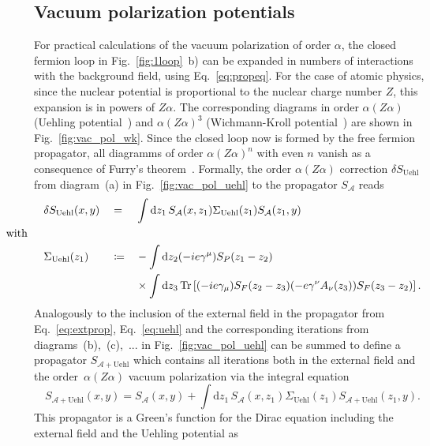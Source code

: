 \subsection{Vacuum polarization potentials}
\label{sec:vacPolTheory}
For practical calculations of the vacuum polarization of order $\alpha$, the closed fermion loop in Fig.~\ref{fig:1loop}~b) can be expanded in numbers of interactions with the background field, using Eq.~\ref{eq:propeq}. For the case of atomic physics, since the nuclear potential is proportional to the nuclear charge number $Z$, this expansion is in powers of $Z\alpha$. The corresponding diagrams in order $\alpha(Z\alpha)$ (Uehling potential~\cite{uehling1935}) and $\alpha(Z\alpha)^3$ (Wichmann-Kroll potential~\cite{wichmann1956}) are shown in Fig.~\ref{fig:vac_pol_wk}. Since the closed loop now is formed by the free fermion propagator, all diagramms of order $\alpha(Z\alpha)^n$ with even $n$ vanish as a consequence of Furry's theorem~\mbox{\cite[Section~10.1.]{peskin1995}}. Formally, the order $\alpha (Z\alpha)$ correction $\delta S_{\text{Uehl}}$ from diagram~(a) in Fig.~\ref{fig:vac_pol_uehl} to the propagator $S_{\mathcal{A}}$ reads
\begin{alignat}{3}
\label{eq:uehl}
&\delta S_{\text{Uehl}}(x,y) &&=&& \int \mathrm{d}z_1\,S_{\mathcal{A}}(x,z_1)\Sigma_{\text{Uehl}}(z_1)S_{\mathcal{A}}(z_1,y)\\
&\hspace{-1.2cm}\text{with}\notag\\
&\Sigma_{\text{Uehl}}(z_1) &&\coloneqq&& -\int\mathrm{d}z_2(-ie\gamma^\mu)S_P(z_1-z_2)\notag\\
&&&&&\times\int\mathrm{d}z_3\,\Tr\left[(-ie\gamma_\mu)S_F(z_2-z_3)(-e\gamma^\nu A_\nu (z_3))S_F(z_3-z_2)\right].\notag
\end{alignat}
Analogously to the inclusion of the external field in the propagator from Eq.~\eqref{eq:extprop}, Eq.~\eqref{eq:uehl} and the corresponding iterations from diagrams~(b),~(c),~... in Fig.~\ref{fig:vac_pol_uehl} can be summed to define a propagator $S_{\mathcal{A}+\text{Uehl}}$ which contains all iterations both in the external field and the order~$\alpha (Z\alpha)$ vacuum polarization via the integral equation
\begin{equation}
S_{\mathcal{A}+\text{Uehl}}(x,y) = S_{\mathcal{A}}(x,y) +  \int \mathrm{d}z_1\,S_{\mathcal{A}}(x,z_1)\Sigma_{\text{Uehl}}(z_1)S_{\mathcal{A}+\text{Uehl}}(z_1,y).
\label{eq:uehlsum}
\end{equation}
This propagator is a Green's function for the Dirac equation including the external field and the Uehling potential as
